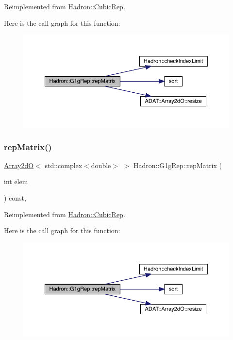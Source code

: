 Reimplemented from \mbox{\hyperlink{structHadron_1_1CubicRep_ac5d7e9e6f4ab1158b5fce3e4ad9e8005}{Hadron\+::\+Cubic\+Rep}}.

Here is the call graph for this function\+:
\nopagebreak
\begin{figure}[H]
\begin{center}
\leavevmode
\includegraphics[width=350pt]{d4/d3c/structHadron_1_1G1gRep_a0671004832091015635bb8565653340c_cgraph}
\end{center}
\end{figure}
\mbox{\label{structHadron_1_1G1gRep_a0671004832091015635bb8565653340c}} 
\subsubsection{\texorpdfstring{repMatrix()}{repMatrix()}\hspace{0.1cm}{\footnotesize\ttfamily [2/2]}}
{\footnotesize\ttfamily \mbox{\hyperlink{classADAT_1_1Array2dO}{Array2dO}}$<$ std\+::complex$<$double$>$ $>$ Hadron\+::\+G1g\+Rep\+::rep\+Matrix (\begin{DoxyParamCaption}\item[{int}]{elem }\end{DoxyParamCaption}) const\hspace{0.3cm}{\ttfamily [inline]}, {\ttfamily [virtual]}}



Reimplemented from \mbox{\hyperlink{structHadron_1_1CubicRep_ac5d7e9e6f4ab1158b5fce3e4ad9e8005}{Hadron\+::\+Cubic\+Rep}}.

Here is the call graph for this function\+:
\nopagebreak
\begin{figure}[H]
\begin{center}
\leavevmode
\includegraphics[width=350pt]{d4/d3c/structHadron_1_1G1gRep_a0671004832091015635bb8565653340c_cgraph}
\end{center}
\end{figure}


